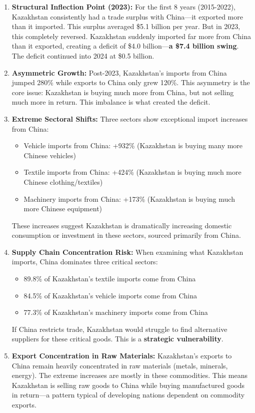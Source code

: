 \documentclass[12pt]{article}
\begin{document}
\begin{enumerate}

\item \textbf{Structural Inflection Point (2023):} For the first 8 years (2015-2022), Kazakhstan consistently had a trade surplus with China---it exported more than it imported. This surplus averaged \$5.1 billion per year. But in 2023, this completely reversed. Kazakhstan suddenly imported far more from China than it exported, creating a deficit of \$4.0 billion---\textbf{a \$7.4 billion swing}. The deficit continued into 2024 at \$0.5 billion.

\item \textbf{Asymmetric Growth:} Post-2023, Kazakhstan's imports from China jumped 280\% while exports to China only grew 120\%. This asymmetry is the core issue: Kazakhstan is buying much more from China, but not selling much more in return. This imbalance is what created the deficit.

\item \textbf{Extreme Sectoral Shifts:} Three sectors show exceptional import increases from China:
\begin{itemize}
\item Vehicle imports from China: +932\% (Kazakhstan is buying many more Chinese vehicles)
\item Textile imports from China: +424\% (Kazakhstan is buying much more Chinese clothing/textiles)  
\item Machinery imports from China: +173\% (Kazakhstan is buying much more Chinese equipment)
\end{itemize}
These increases suggest Kazakhstan is dramatically increasing domestic consumption or investment in these sectors, sourced primarily from China.

\item \textbf{Supply Chain Concentration Risk:} When examining what Kazakhstan imports, China dominates three critical sectors:
\begin{itemize}
\item 89.8\% of Kazakhstan's textile imports come from China
\item 84.5\% of Kazakhstan's vehicle imports come from China
\item 77.3\% of Kazakhstan's machinery imports come from China
\end{itemize}
If China restricts trade, Kazakhstan would struggle to find alternative suppliers for these critical goods. This is a \textbf{strategic vulnerability}.

\item \textbf{Export Concentration in Raw Materials:} Kazakhstan's exports to China remain heavily concentrated in raw materials (metals, minerals, energy). The extreme increases are mostly in these commodities. This means Kazakhstan is selling raw goods to China while buying manufactured goods in return---a pattern typical of developing nations dependent on commodity exports.

\end{enumerate}
\end{document}
